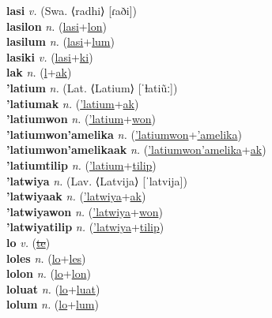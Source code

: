 \textbf{lasi} \textit{v.} (Swa. ⟨radhi⟩ [ɾaði])
 \label{lasi} \\
\textbf{lasilon} \textit{n.} (\hyperref[lasi]{lasi}+\hyperref[lon]{lon})
 \label{lasilon} \\
\textbf{lasilum} \textit{n.} (\hyperref[lasi]{lasi}+\hyperref[lum]{lum})
 \label{lasilum} \\
\textbf{lasiki} \textit{v.} (\hyperref[lasi]{lasi}+\hyperref[ki]{ki})
 \label{lasiki} \\
\textbf{lak} \textit{n.} (\hyperref[l]{l}+\hyperref[ak]{ak})
 \label{lak} \\
\textbf{'latium} \textit{n.} (Lat. ⟨Latium⟩ [ˈɫatiũː])
 \label{'latium} \\
\textbf{'latiumak} \textit{n.} (\hyperref['latium]{'latium}+\hyperref[ak]{ak})
 \label{'latiumak} \\
\textbf{'latiumwon} \textit{n.} (\hyperref['latium]{'latium}+\hyperref[won]{won})
 \label{'latiumwon} \\
\textbf{'latiumwon'amelika} \textit{n.} (\hyperref['latiumwon]{'latiumwon}+\hyperref['amelika]{'amelika})
 \label{'latiumwon'amelika} \\
\textbf{'latiumwon'amelikaak} \textit{n.} (\hyperref['latiumwon'amelika]{'latiumwon'amelika}+\hyperref[ak]{ak})
 \label{'latiumwon'amelikaak} \\
\textbf{'latiumtilip} \textit{n.} (\hyperref['latium]{'latium}+\hyperref[tilip]{tilip})
 \label{'latiumtilip} \\
\textbf{'latwiya} \textit{n.} (Lav. ⟨Latvija⟩ [ˈlatvija])
 \label{'latwiya} \\
\textbf{'latwiyaak} \textit{n.} (\hyperref['latwiya]{'latwiya}+\hyperref[ak]{ak})
 \label{'latwiyaak} \\
\textbf{'latwiyawon} \textit{n.} (\hyperref['latwiya]{'latwiya}+\hyperref[won]{won})
 \label{'latwiyawon} \\
\textbf{'latwiyatilip} \textit{n.} (\hyperref['latwiya]{'latwiya}+\hyperref[tilip]{tilip})
 \label{'latwiyatilip} \\
\textbf{lo} \textit{v.} (\hyperref[te]{\sout{te}})
 \label{lo} \\
\textbf{loles} \textit{n.} (\hyperref[lo]{lo}+\hyperref[les]{les})
 \label{loles} \\
\textbf{lolon} \textit{n.} (\hyperref[lo]{lo}+\hyperref[lon]{lon})
 \label{lolon} \\
\textbf{loluat} \textit{n.} (\hyperref[lo]{lo}+\hyperref[luat]{luat})
 \label{loluat} \\
\textbf{lolum} \textit{n.} (\hyperref[lo]{lo}+\hyperref[lum]{lum})

